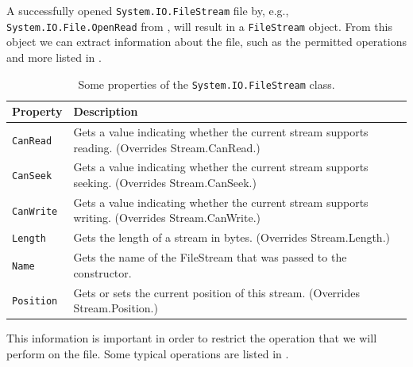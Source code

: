 \documentclass[fsharpNotes.tex]{subfiles}
\begin{document}
A successfully opened \lstinline!System.IO.FileStream! file by, e.g., \lstinline!System.IO.File.OpenRead! from , will result in a \lstinline!FileStream! object. From this object we can extract information about the file, such as the permitted operations and more listed in . %
%
%
%
%
%
%
\begin{table}
  \centering
  \begin{tabularx}{\linewidth}{|l|X|}
    \hline
    \rowcolor{headerRowColor} Property & Description\\
    \hline
    \lstinline{CanRead} & Gets a value indicating whether the current stream supports reading. (Overrides Stream.CanRead.)\\
    \hline
    \lstinline{CanSeek} & Gets a value indicating whether the current stream supports seeking. (Overrides Stream.CanSeek.)\\
    \hline
    \lstinline{CanWrite} & Gets a value indicating whether the current stream supports writing. (Overrides Stream.CanWrite.)\\
    \hline
    \lstinline{Length} & Gets the length of a stream in bytes. (Overrides Stream.Length.)\\
    \hline
    \lstinline{Name} & Gets the name of the FileStream that was passed to the constructor.\\
    \hline
    \lstinline{Position} & Gets or sets the current position of this stream. (Overrides Stream.Position.)\\
    \hline
  \end{tabularx}
  \caption{Some properties of the \lstinline!System.IO.FileStream! class.}
  \label{tab:fileStreamProperties}
\end{table}
This information is important in order to restrict the operation that we will perform on the file. Some typical operations are listed in .%
%
%
%
%
%
%
%
\end{document}
